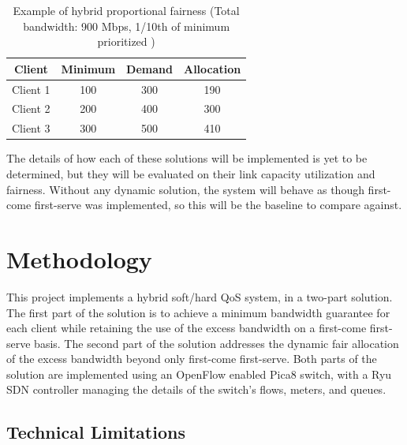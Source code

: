\documentclass[accepted,single]{gipaper}
\begin{document}
\begin{table}[h]
	\label{hybrid_table}
	\vspace{-3mm}
	\begin{center}
		\begin{small}
			\begin{tabular}{cccc}
				Client & Minimum & Demand & Allocation \\
				\hline
				Client 1 & 100 & 300 & 190 \\
				Client 2 & 200 & 400 & 300 \\
				Client 3 & 300 & 500 & 410 \\
			\end{tabular}
		\end{small}
	\end{center}
	\caption{Example of hybrid proportional fairness (Total bandwidth: 900 Mbps, 1/10th of minimum prioritized )}
	\vspace{-3mm}
\end{table}
\fi

The details of how each of these solutions will be implemented is yet to be determined, but they will be evaluated on their link capacity utilization and fairness. Without any dynamic solution, the system will behave as though first-come first-serve was implemented, so this will be the baseline to compare against.
\fi

\section{Methodology}
\label{methodology}

This project implements a hybrid soft/hard QoS system, in a two-part solution. The first part of the solution is to achieve a minimum bandwidth guarantee for each client while retaining the use of the excess bandwidth on a first-come first-serve basis. The second part of the solution addresses the dynamic fair allocation of the excess bandwidth beyond only first-come first-serve. Both parts of the solution are implemented using an OpenFlow enabled Pica8 switch, with a Ryu SDN controller managing the details of the switch's flows, meters, and queues.

\subsection{Technical Limitations}
\label{tech_limitations}
\end{document}
